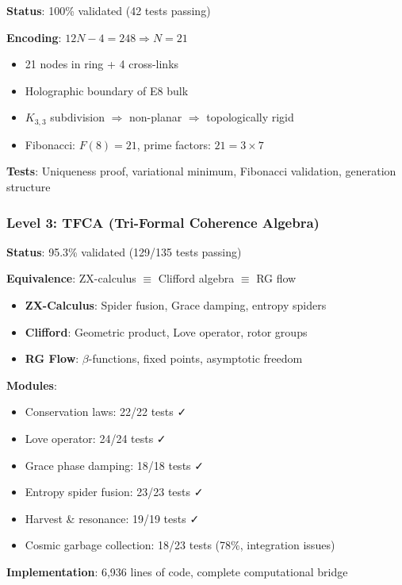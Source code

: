 \documentclass[12pt,a4paper]{article}
\begin{document}
\textbf{Status}: 100\% validated (42 tests passing)

\textbf{Encoding}: $12N - 4 = 248 \Rightarrow N = 21$

\begin{itemize}
\item 21 nodes in ring + 4 cross-links
\item Holographic boundary of E8 bulk
\item $K_{3,3}$ subdivision $\Rightarrow$ non-planar $\Rightarrow$ topologically rigid
\item Fibonacci: $F(8) = 21$, prime factors: $21 = 3 \times 7$
\end{itemize}

\textbf{Tests}: Uniqueness proof, variational minimum, Fibonacci validation, generation structure

\subsubsection{Level 3: TFCA (Tri-Formal Coherence Algebra)}

\textbf{Status}: 95.3\% validated (129/135 tests passing)

\textbf{Equivalence}: ZX-calculus $\equiv$ Clifford algebra $\equiv$ RG flow

\begin{itemize}
\item \textbf{ZX-Calculus}: Spider fusion, Grace damping, entropy spiders
\item \textbf{Clifford}: Geometric product, Love operator, rotor groups
\item \textbf{RG Flow}: $\beta$-functions, fixed points, asymptotic freedom
\end{itemize}

\textbf{Modules}:
\begin{itemize}
\item Conservation laws: 22/22 tests ✓
\item Love operator: 24/24 tests ✓
\item Grace phase damping: 18/18 tests ✓
\item Entropy spider fusion: 23/23 tests ✓
\item Harvest \& resonance: 19/19 tests ✓
\item Cosmic garbage collection: 18/23 tests (78\%, integration issues)
\end{itemize}

\textbf{Implementation}: 6,936 lines of code, complete computational bridge
\end{document}
